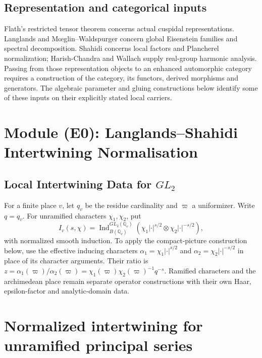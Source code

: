 \subsection{Representation and categorical inputs}
Flath's restricted tensor theorem concerns actual cuspidal
representations. Langlands and M\oe glin--Waldspurger concern global
Eisenstein families and spectral decomposition. Shahidi concerns
local factors and Plancherel normalization; Harish-Chandra and Wallach
supply real-group harmonic analysis. Passing from those representation
objects to an enhanced automorphic category requires a construction
of the category, its functors, derived morphisms and generators.
The algebraic parameter and gluing constructions below identify some
of these inputs on their explicitly stated local carriers.
\section{Module (E0): Langlands--Shahidi Intertwining Normalisation}
\label{v4-arith:w6-d:E0}

\subsection{Local Intertwining Data for \(GL_{2}\)}

\begin{setup}
\label{v4-arith:w6-d:setup:place-intertwining}
For a finite place $v$, let $q_v$ be the residue cardinality and $\varpi$ a uniformizer. Write $q=q_v$. For unramified characters $\chi_1,\chi_2$, put
\begin{equation}
\label{v4-arith:w6-d:eq:induced}
 I_v(s,\chi)=\operatorname{Ind}_{B(\mathbb Q_v)}^{GL_2(\mathbb Q_v)}
 (\chi_1|\cdot|^{s/2}\otimes\chi_2|\cdot|^{-s/2}),
\end{equation}
with normalized smooth induction. To apply the compact-picture
construction below, use the effective inducing characters
$\alpha_1=\chi_1|\cdot|^{s/2}$ and
$\alpha_2=\chi_2|\cdot|^{-s/2}$ in place of its character arguments.
Their ratio is
$z=\alpha_1(\varpi)/\alpha_2(\varpi)
 =\chi_1(\varpi)\chi_2(\varpi)^{-1}q^{-s}$.
Ramified characters and the archimedean place remain separate operator
constructions with their own Haar, epsilon-factor and analytic-domain data.
\end{setup}

\section{Normalized intertwining for unramified principal series}

